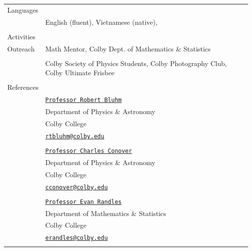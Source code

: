 \documentclass[10pt]{article}
\begin{document}
\begin{longtable}{ l m{13.5cm}   }
  				

  \large{Languages}     & \\
  						& English (fluent), Vietnamese (native), \\
						& \\
  						 
  \large{Activities}    & \\ 
  \large{Outreach}		& Math Mentor, Colby Dept. of Mathematics \& Statistics \\
  						& \\
  						& Colby Society of Physics Students, Colby Photography Club, Colby Ultimate Frisbee \\
     					& \\

\newpage

  \large{References}	& \\
  						& \href{http://www.colby.edu/physics/faculty/robert.html}{\texttt{Professor Robert Bluhm}} \\
  						& Department of Physics \& Astronomy \\
  						& Colby College \\
  						& {\href{mailto:rtbluhm@colby.edu}{\texttt{rtbluhm@colby.edu}}} \\
  						&  \\
  						
  						
  						& \href{https://www.colby.edu/directory/profile/charles.conover/}{\texttt{Professor Charles Conover}} \\
  						& Department of Physics \& Astronomy \\
  						& Colby College \\
  						& {\href{mailto:cconover@colby.edu}{\texttt{cconover@colby.edu}}}\\
  						& \\
  						
  						
  						
  						& \href{https://personal.colby.edu/~erandles/}{\texttt{Professor Evan Randles}} \\
  						& Department of Mathematics \& Statistics \\
  						& Colby College \\
  						& {\href{mailto:erandles@colby.edu}{\texttt{erandles@colby.edu}}} \\
  						& \\
  						
  						
  
  
\end{longtable}
\end{document}
